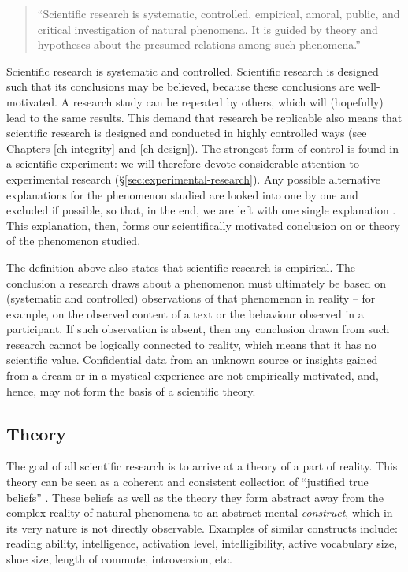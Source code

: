 \documentclass[
]{book}
\begin{document}
\begin{quote}
``Scientific
research is systematic, controlled, empirical, amoral, public, and
critical investigation of natural phenomena. It is guided by theory and hypotheses about the presumed relations among such phenomena.''
\end{quote}

Scientific research is systematic and controlled. Scientific research is designed such that its conclusions may be believed, because these conclusions are well-motivated. A research study can be repeated by others, which will (hopefully) lead to the same results. This demand that research be replicable also means that scientific research is designed and conducted in highly controlled ways (see Chapters \ref{ch-integrity} and \ref{ch-design}).
The strongest form of control is found in a scientific experiment: we will therefore devote considerable attention to experimental research (§\ref{sec:experimental-research}). Any possible alternative explanations for the phenomenon studied are looked into one by one and excluded if possible, so that, in the end, we are left with one single explanation \citep{KL00}. This explanation, then, forms our scientifically motivated conclusion on or theory of the phenomenon studied.

The definition above also states that scientific research is empirical. The conclusion a research draws about a phenomenon must ultimately be based on (systematic and controlled) observations of that phenomenon in reality -- for example, on the observed content of a text or the behaviour observed in a participant. If such observation is absent, then any conclusion drawn from such research cannot be logically connected to reality, which means that it has no scientific value. Confidential data from an unknown source or insights gained from a dream or in a mystical experience are not empirically motivated, and, hence, may not form the basis of a scientific theory.

\hypertarget{sec:theory}{%
\subsection{Theory}\label{sec:theory}}

The goal of all scientific research is to arrive at a theory of a part of reality. This theory can be seen as a coherent and consistent collection of ``justified true beliefs'' \citep{Mort03}. These beliefs as well as the theory they form abstract away from the complex reality of natural phenomena to an abstract mental \emph{construct}, which in its very nature is not directly observable. Examples of similar constructs include: reading ability, intelligence, activation level, intelligibility, active vocabulary size, shoe size, length of commute, introversion, etc.
\end{document}
